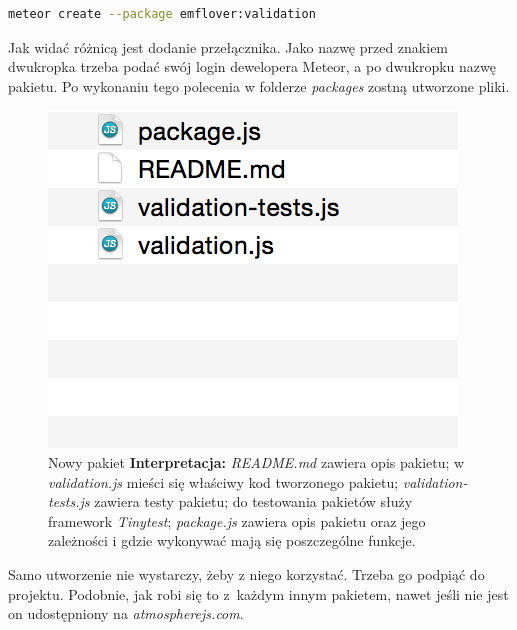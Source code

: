\documentclass{xmgr}
\begin{document}
\newpage

\begin{lstlisting}[language=bash]
meteor create --package emflover:validation
\end{lstlisting}

\noindent Jak widać różnicą jest dodanie przełącznika. Jako nazwę przed znakiem dwukropka trzeba podać swój login dewelopera Meteor, a po dwukropku nazwę pakietu.  Po wykonaniu tego polecenia w folderze \textit{packages} zostną utworzone pliki.

\begin{figure}[H]
\centering
\includegraphics[width=0.7\hsize]{images/newPackage}
\caption{Nowy pakiet\label{RYS.19} \newline \newline \hspace{\linewidth} \textbf{Interpretacja:} \textit{README.md} zawiera opis pakietu; w  \textit{validation.js} mieści się właściwy kod tworzonego pakietu; \textit{validation-tests.js} zawiera testy pakietu; do testowania pakietów służy framework \textit{Tinytest}; \textit{package.js} zawiera opis pakietu oraz jego zależności i gdzie wykonywać mają się poszczególne funkcje.}
\end{figure}


\noindent Samo utworzenie nie wystarczy, żeby z niego korzystać. Trzeba go podpiąć do projektu. Podobnie, jak robi się to z~każdym innym pakietem, nawet jeśli nie jest on udostępniony na \textit{atmospherejs.com}.
\end{document}

